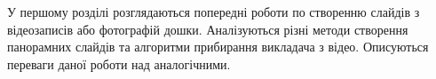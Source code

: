У першому розділі розглядаються попередні роботи
по створенню слайдів з відеозаписів або фотографій дошки.
Аналізуються різні методи створення панорамних слайдів
та алгоритми прибирання викладача з відео. Описуються переваги 
даної роботи над аналогічними.